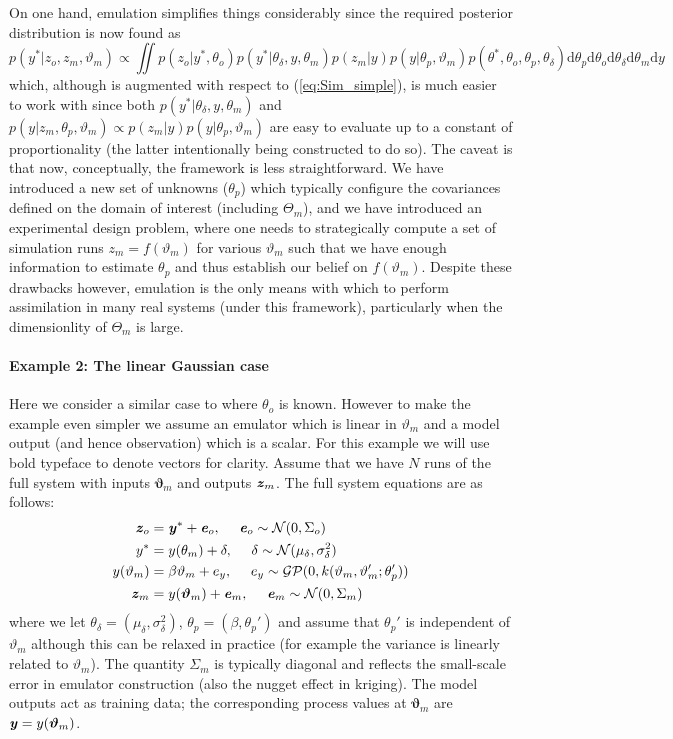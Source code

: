 \documentclass[10pt,a4paper]{article}
\newcommand{\varthetab} {{\boldsymbol{\vartheta}}}
\newcommand{\intd} {\textrm{d}}
\newcommand{\evec} {\textbf{\textit{e}}}
\newcommand{\yvec} {\textbf{\textit{y}}}
\newcommand{\zvec} {\textbf{\textit{z}}}
\begin{document}
On one hand, emulation simplifies things considerably since the required posterior distribution is now found as 
\begin{equation}
p(y^*|z_o,z_m,\vartheta_m) \propto \iint p(z_o | y^*, \theta_o)p(y^* | \theta_\delta, y,\theta_m)p(z_m | y)p(y | \theta_p,\vartheta_m)p(\theta^*,\theta_o, \theta_p, \theta_\delta) \intd \theta_p \intd\theta_o \intd\theta_\delta \intd\theta_m \intd y
\end{equation}
\noindent which, although is augmented with respect to (\ref{eq:Sim_simple}), is much easier to work with since both $p(y^* | \theta_\delta,y,\theta_m)$ and  $p(y | z_m,\theta_p,\vartheta_m) \propto p(z_m | y)p(y | \theta_p,\vartheta_m)$ are easy to evaluate up to a constant of proportionality (the latter intentionally being constructed to do so). The caveat is that now, conceptually, the framework is less straightforward. We have introduced a new set of unknowns ($\theta_p$) which typically configure the covariances defined on the domain of interest (including $\Theta_m$), and we have introduced an experimental design problem, where one needs to strategically compute a set of simulation runs $z_m = f(\vartheta_m)$ for various $\vartheta_m$ such that we have enough information to estimate $\theta_p$ and thus establish our belief on $f(\vartheta_m)$. Despite these drawbacks however, emulation is the only means with which to perform assimilation in many real systems (under this framework), particularly when the dimensionlity of $\Theta_m$ is large.

\paragraph{Example 2: The linear Gaussian case} Here we consider a similar case to \cite{Higdon_2004} where $\theta_o$ is known. However to make the example even simpler we assume an emulator which is linear in $\vartheta_m$ and a model output (and hence observation) which is a scalar. For this example we will use bold typeface to denote vectors for clarity. Assume that we have $N$ runs of the full system with inputs $\varthetab_m$ and outputs $\zvec_m$. The full system equations are as follows:
\begin{align}
\zvec_o &= \yvec^* + \evec_o,~~~~ \evec_o \sim \mathcal{N}(0,\Sigma_o) \\
y^* &= y(\theta_m) + \delta,~~~~ \delta \sim \mathcal{N}(\mu_\delta,\sigma^2_\delta) \\
y(\vartheta_m) &= \beta\vartheta_m + e_y,~~~~ e_y \sim \mathcal{GP}(0,k(\vartheta_m,\vartheta_m';\theta_p')) \\
\zvec_m &= y(\varthetab_m) + \evec_m, ~~~~ \evec_m \sim \mathcal{N}(0,\Sigma_m)
\end{align}
\noindent where we let $\theta_\delta = (\mu_\delta,\sigma^2_\delta)$, $\theta_p = (\beta,\theta_p')$ and assume that $\theta_p'$ is independent of $\vartheta_m$ although this can be relaxed in practice (for example the variance is linearly related to $\vartheta_m$). The quantity $\Sigma_m$ is typically diagonal and reflects the small-scale error in emulator construction (also the nugget effect in kriging). The model outputs act as training data; the corresponding process values at $\varthetab_m$ are $\yvec = y(\varthetab_m)$. 
\end{document}
